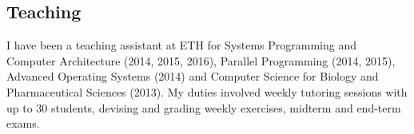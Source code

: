\documentclass[margin,line]{resume}
\begin{document}
\begin{resume}
    \section{\mysidestyle Teaching}

    I have been a teaching assistant at ETH for Systems Programming and Computer
    Architecture (2014, 2015, 2016), Parallel Programming (2014, 2015), Advanced
    Operating Systems (2014) and Computer Science for Biology and Pharmaceutical
    Sciences (2013). My duties involved weekly tutoring sessions with up to 30
    students, devising and grading weekly exercises, midterm and end-term exams.



\end{resume}
\end{document}
